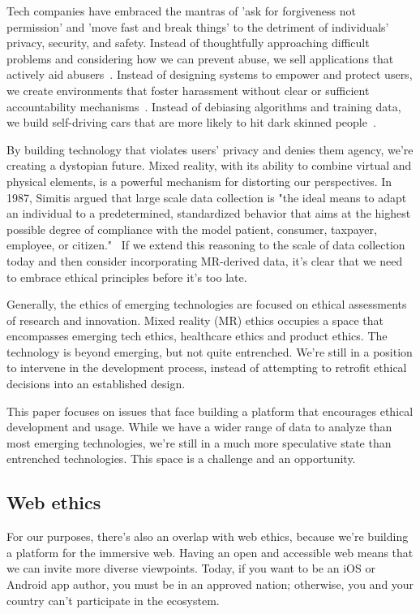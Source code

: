 Tech companies have embraced the mantras of 'ask for forgiveness not permission' and 'move fast and break things' to the detriment of individuals' privacy, security, and safety. Instead of thoughtfully approaching difficult problems and considering how we can prevent abuse, we sell applications that actively aid abusers~\cite{dell}. Instead of designing systems to empower and protect users, we create environments that foster harassment without clear or sufficient accountability mechanisms~\cite{dreyfuss}. Instead of debiasing algorithms and training data, we build self-driving cars that are more likely to hit dark skinned people~\cite{wilson2019predictive}.

By building technology that violates users' privacy and denies them agency, we're creating a dystopian future. Mixed reality, with its ability to combine virtual and physical elements, is a powerful mechanism for distorting our perspectives.  In 1987, Simitis argued that large scale data collection is "the ideal means to adapt an individual to a predetermined, standardized behavior that aims at the highest possible degree of compliance with the model patient, consumer, taxpayer, employee, or citizen."~\cite{simitis} If we extend this reasoning to the scale of data collection today and then consider incorporating MR-derived data, it's clear that we need to embrace ethical principles before it's too late.

Generally, the ethics of emerging technologies are focused on ethical assessments of research and innovation. Mixed reality (MR) ethics occupies a space that encompasses emerging tech ethics, healthcare ethics and product ethics. The technology is beyond emerging, but not quite entrenched. We're still in a position to intervene in the development process, instead of attempting to retrofit ethical decisions into an established design. 

This paper focuses on issues that face building a platform that encourages ethical development and usage. While we have a wider range of data to analyze than most emerging technologies, we're still in a much more speculative state than entrenched technologies. This space is a challenge and an opportunity.

\subsection{Web ethics}

For our purposes, there's also an overlap with web ethics, because we're building a platform for the immersive web. Having an open and accessible web means that we can invite more diverse viewpoints. Today, if you want to be an iOS or Android app author, you must be in an approved nation; otherwise, you and your country can't participate in the ecosystem.

